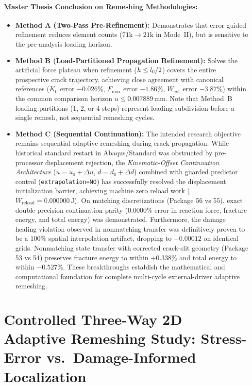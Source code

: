 \paragraph{Master Thesis Conclusion on Remeshing Methodologies:}
\begin{itemize}
  \item \textbf{Method A (Two-Pass Pre-Refinement):} Demonstrates that error-guided refinement reduces element counts ($71\mathrm{k} \to 21\mathrm{k}$ in Mode~II), but is sensitive to the pre-analysis loading horizon.
  \item \textbf{Method B (Load-Partitioned Propagation Refinement):} Solves the artificial force plateau when refinement ($h \le l_0 / 2$) covers the entire prospective crack trajectory, achieving close agreement with canonical references ($K_0$ error $-0.026\%$, $F_{\max}$ error $-1.86\%$, $W_{\mathrm{ext}}$ error $-3.87\%$) within the common comparison horizon $u \le 0.007889\,\mathrm{mm}$. Note that Method~B loading partitions (1, 2, or 4 steps) represent loading subdivision before a single remesh, not sequential remeshing cycles.
  \item \textbf{Method C (Sequential Continuation):} The intended research objective remains sequential adaptive remeshing during crack propagation. While historical standard restart in Abaqus/Standard was obstructed by pre-processor displacement rejection, the \emph{Kinematic-Offset Continuation Architecture} ($u = u_0 + \Delta u$, $d = d_0 + \Delta d$) combined with guarded predictor control (\texttt{extrapolation=NO}) has successfully resolved the displacement initialization barrier, achieving machine zero reload work ($W_{\mathrm{reload}} = 0.000000\,\mathrm{J}$). On matching discretizations (Package 56 vs 55), exact double-precision continuation parity ($\mathbf{0.0000\%}$ error in reaction force, fracture energy, and total energy) was demonstrated. Furthermore, the damage healing violation observed in nonmatching transfer was definitively proven to be a $100\%$ spatial interpolation artifact, dropping to $-0.00012$ on identical grids. Nonmatching state transfer with corrected crack-slit geometry (Package 53 vs 54) preserves fracture energy to within $+0.338\%$ and total energy to within $-0.527\%$. These breakthroughs establish the mathematical and computational foundation for complete multi-cycle external-driver adaptive remeshing.
\end{itemize}

\section{Controlled Three-Way 2D Adaptive Remeshing Study: Stress-Error vs.\ Damage-Informed Localization}
\label{sec:three_way_controlled_comparison}

